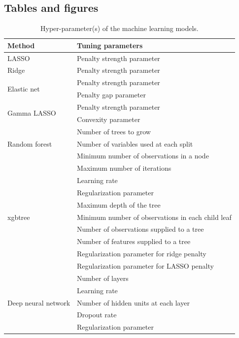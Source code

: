 \begin{refsection}
\printbibliography[heading=subbibliography]


\clearpage
\section{Tables and figures}
\begin{table}[htbp]
  \centering
    \begin{tabular}{l|l}
    Method & Tuning parameters \\
    \midrule
    LASSO & Penalty strength parameter \\
    \midrule
    Ridge & Penalty strength parameter \\
    \midrule
    \multirow{2}[2]{*}{Elastic net} & Penalty strength parameter \\
          & Penalty gap parameter \\
    \midrule
    \multirow{2}[2]{*}{Gamma LASSO} & Penalty strength parameter \\
          & Convexity parameter \\
    \midrule
    \multirow{3}[2]{*}{Random forest} & Number of trees to grow \\
          & Number of variables used at each split \\
          & Minimum number of observations in a node \\
    \midrule
    \multirow{9}[2]{*}{xgbtree} & Maximum number of iterations \\
          & Learning rate \\
          & Regularization parameter \\
          & Maximum depth of the tree \\
          & Minimum number of observations in each child leaf \\
          & Number of observations supplied to a tree \\
          & Number of features supplied to a tree \\
          & Regularization parameter for ridge penalty \\
          & Regularization parameter for LASSO penalty \\
    \midrule
    \multirow{5}[1]{*}{Deep neural network} & Number of layers  \\
          & Learning rate \\
          & Number of hidden units at each layer \\
          & Dropout rate \\
          & Regularization parameter \\
    \end{tabular}%
  \caption{Hyper-parameter(s) of the machine learning models.}
  \label{tab:hyperpara}%
\end{table}%


\end{refsection}
